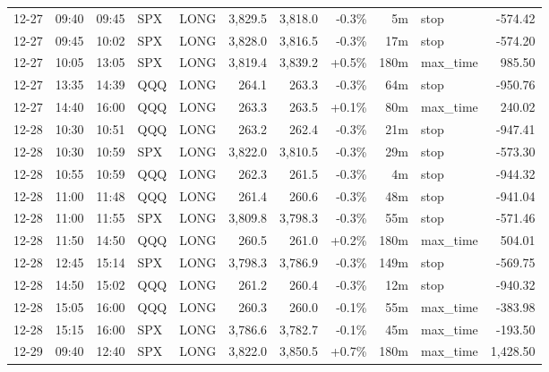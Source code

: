 \documentclass[11pt,a4paper,twoside]{article}
\begin{document}
\begin{center}
\begin{longtable}{>{\color{txtmain}}l l l l l r r r r >{\color{txtmain}}l r}
12-27 & 09:40 & 09:45 & SPX & LONG & 3,829.5 & 3,818.0 & \textcolor{lossred}{-0.3\%} & 5m & stop & \textcolor{lossred}{-574.42} \\
12-27 & 09:45 & 10:02 & SPX & LONG & 3,828.0 & 3,816.5 & \textcolor{lossred}{-0.3\%} & 17m & stop & \textcolor{lossred}{-574.20} \\
12-27 & 10:05 & 13:05 & SPX & LONG & 3,819.4 & 3,839.2 & \textcolor{wingreen}{+0.5\%} & 180m & max\_time & \textcolor{wingreen}{985.50} \\
12-27 & 13:35 & 14:39 & QQQ & LONG & 264.1 & 263.3 & \textcolor{lossred}{-0.3\%} & 64m & stop & \textcolor{lossred}{-950.76} \\
12-27 & 14:40 & 16:00 & QQQ & LONG & 263.3 & 263.5 & \textcolor{wingreen}{+0.1\%} & 80m & max\_time & \textcolor{wingreen}{240.02} \\
12-28 & 10:30 & 10:51 & QQQ & LONG & 263.2 & 262.4 & \textcolor{lossred}{-0.3\%} & 21m & stop & \textcolor{lossred}{-947.41} \\
12-28 & 10:30 & 10:59 & SPX & LONG & 3,822.0 & 3,810.5 & \textcolor{lossred}{-0.3\%} & 29m & stop & \textcolor{lossred}{-573.30} \\
12-28 & 10:55 & 10:59 & QQQ & LONG & 262.3 & 261.5 & \textcolor{lossred}{-0.3\%} & 4m & stop & \textcolor{lossred}{-944.32} \\
12-28 & 11:00 & 11:48 & QQQ & LONG & 261.4 & 260.6 & \textcolor{lossred}{-0.3\%} & 48m & stop & \textcolor{lossred}{-941.04} \\
12-28 & 11:00 & 11:55 & SPX & LONG & 3,809.8 & 3,798.3 & \textcolor{lossred}{-0.3\%} & 55m & stop & \textcolor{lossred}{-571.46} \\
12-28 & 11:50 & 14:50 & QQQ & LONG & 260.5 & 261.0 & \textcolor{wingreen}{+0.2\%} & 180m & max\_time & \textcolor{wingreen}{504.01} \\
12-28 & 12:45 & 15:14 & SPX & LONG & 3,798.3 & 3,786.9 & \textcolor{lossred}{-0.3\%} & 149m & stop & \textcolor{lossred}{-569.75} \\
12-28 & 14:50 & 15:02 & QQQ & LONG & 261.2 & 260.4 & \textcolor{lossred}{-0.3\%} & 12m & stop & \textcolor{lossred}{-940.32} \\
12-28 & 15:05 & 16:00 & QQQ & LONG & 260.3 & 260.0 & \textcolor{lossred}{-0.1\%} & 55m & max\_time & \textcolor{lossred}{-383.98} \\
12-28 & 15:15 & 16:00 & SPX & LONG & 3,786.6 & 3,782.7 & \textcolor{lossred}{-0.1\%} & 45m & max\_time & \textcolor{lossred}{-193.50} \\
12-29 & 09:40 & 12:40 & SPX & LONG & 3,822.0 & 3,850.5 & \textcolor{wingreen}{+0.7\%} & 180m & max\_time & \textcolor{wingreen}{1,428.50} \\

\end{longtable}
\end{center}
\end{document}

